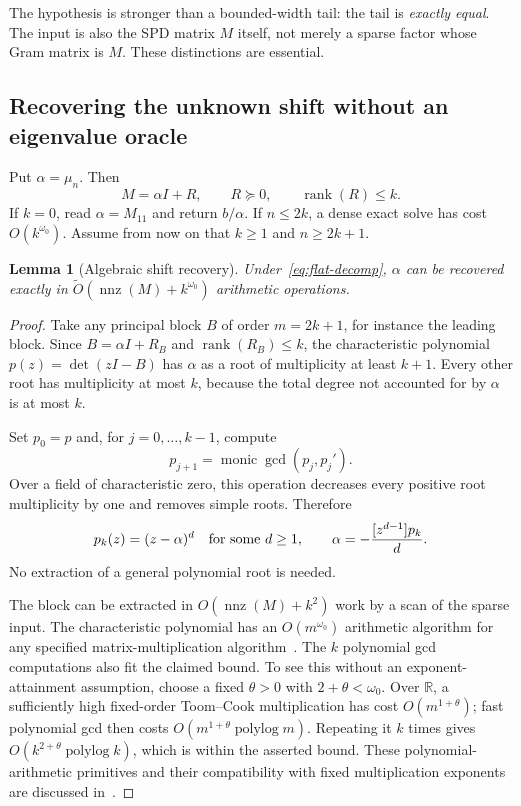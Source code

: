 \documentclass[11pt,a4paper]{article}
\newcommand{\R}{\mathbb R}
\newcommand{\nnz}{\operatorname{nnz}}
\newcommand{\rank}{\operatorname{rank}}
\newcommand{\softO}{\widetilde O}
\newtheorem{lemma}[theorem]{Lemma}
\theoremstyle{definition}
\theoremstyle{remark}
\begin{document}
The hypothesis is stronger than a bounded-width tail: the tail is \emph{exactly equal}. The input is also the SPD matrix $M$ itself, not merely a sparse factor whose Gram matrix is $M$. These distinctions are essential.

\subsection{Recovering the unknown shift without an eigenvalue oracle}
Put $\alpha=\mu_n$. Then
\begin{equation}
 M=\alpha I+R,\qquad R\succeq0,\qquad \rank(R)\le k.
 \label{eq:flat-decomp}
\end{equation}
If $k=0$, read $\alpha=M_{11}$ and return $b/\alpha$. If $n\le2k$, a dense exact solve has cost $O(k^{\omega_0})$. Assume from now on that $k\ge1$ and $n\ge2k+1$.

\begin{lemma}[Algebraic shift recovery]
\label{lem:shift}
Under~\eqref{eq:flat-decomp}, $\alpha$ can be recovered exactly in
$\softO(\nnz(M)+k^{\omega_0})$ arithmetic operations.
\end{lemma}
\begin{proof}
Take any principal block $B$ of order $m=2k+1$, for instance the leading block. Since $B=\alpha I+R_B$ and $\rank(R_B)\le k$, the characteristic polynomial
$p(z)=\det(zI-B)$ has $\alpha$ as a root of multiplicity at least $k+1$. Every other root has multiplicity at most $k$, because the total degree not accounted for by $\alpha$ is at most $k$.

Set $p_0=p$ and, for $j=0,\ldots,k-1$, compute
\[
 p_{j+1}=\operatorname{monic}\gcd(p_j,p_j').
\]
Over a field of characteristic zero, this operation decreases every positive root multiplicity by one and removes simple roots. Therefore
\[
 p_k(z)=(z-\alpha)^d\quad\hbox{for some }d\ge1,
 \qquad
 \alpha=-\frac{[z^{d-1}]p_k}{d}.
\]
No extraction of a general polynomial root is needed.

The block can be extracted in $O(\nnz(M)+k^2)$ work by a scan of the sparse input. The characteristic polynomial has an $O(m^{\omega_0})$ arithmetic algorithm for any specified matrix-multiplication algorithm~\cite[Theorem 1.1]{np}. The $k$ polynomial gcd computations also fit the claimed bound. To see this without an exponent-attainment assumption, choose a fixed $\theta>0$ with $2+\theta<\omega_0$. Over $\R$, a sufficiently high fixed-order Toom--Cook multiplication has cost $O(m^{1+\theta})$; fast polynomial gcd then costs $O(m^{1+\theta}\operatorname{polylog}m)$. Repeating it $k$ times gives $O(k^{2+\theta}\operatorname{polylog}k)$, which is within the asserted bound. These polynomial-arithmetic primitives and their compatibility with fixed multiplication exponents are discussed in~\cite[Section 1.1]{np}.
\end{proof}
\end{document}
